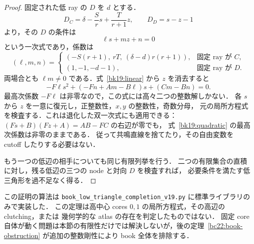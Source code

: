 \begin{proof}
固定された低 ray の $D$ を $d$ とする．
\[
 D_C=\delta-\frac Sr s+\frac T{r+1}z,\qquad
 D_D=s-z-1
\]
より，その $D$ の条件は
\begin{equation}\label{bk19:linear}
 \ell s+mz+n=0
\end{equation}
という一次式であり，係数は
\[
 (\ell,m,n)=
 \begin{cases}
 (-S(r+1),\ rT,\ (\delta-d)r(r+1)),&\text{固定 ray が }C,\\
 (1,-1,-d-1),&\text{固定 ray が }D.
 \end{cases}
\]
両場合とも $\ell m\ne0$ である．式~\eqref{bk19:linear} から $z$ を消去すると
\begin{equation}\label{bk19:quadratic}
 -F\ell s^2+(-Fn+Am-B\ell)s+(Cm-Bn)=0.
\end{equation}
最高次係数 $-F\ell$ は非零なので，この式には高々二つの整数解しかない．
各 $s$ から $z$ を一意に復元し，正整数性，$x,y$ の整数性，奇数分母，
元の局所方程式を検査する．これは退化した双一次式にも適用できる：
$(Fs+B)(Fz+A)=AB-FC$ の右辺が零でも，
式~\eqref{bk19:quadratic} の最高次係数は非零のままである．
従って共鳴直線を捨てたり，その自由変数を cutoff したりする必要はない．

もう一つの低辺の相手についても同じ有限列挙を行う．
二つの有限集合の直積に対し，残る低辺の三つの node と対向 $D$ を検査すれば，
必要条件を満たす低三角形を過不足なく得る．
\end{proof}

この証明の算法は
\texttt{book\_low\_triangle\_completion\_v19.py} に標準ライブラリのみで実装した．
この定理は高中心 cores $0,1$ の局所方程式，その高辺の clutching，または
幾何学的な atlas の存在を判定したものではない．
固定 core 自体が動く問題は本節の有限性だけでは解決しないが，後の定理~\ref{bc22:book-obstruction} が追加の整数剛性により book 全体を排除する．
